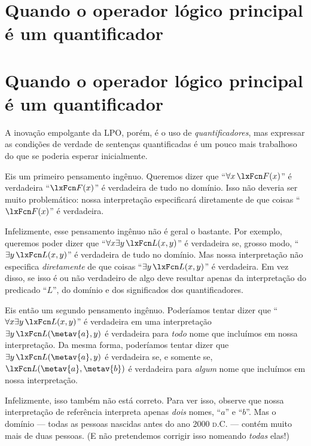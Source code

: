 \ifHTMLtarget
\section{Quando o operador lógico principal é um quantificador}
\else
\section[Quantificadores]{Quando o operador lógico principal é um quantificador}
\fi
\label{s:MainLogicalOperatorQuantifier}

A inovação empolgante da LPO, porém, é o uso de \emph{quantificadores}, mas expressar as condições de verdade de sentenças quantificadas é um pouco mais trabalhoso do que se poderia esperar inicialmente.

Eis um primeiro pensamento ingênuo. Queremos dizer que \textquotedblleft $\forall x\, \atom{F}{x}$\textquotedblright{} é verdadeira \ifeff{} \textquotedblleft $\atom{F}{x}$\textquotedblright{} é verdadeira de tudo no domínio. Isso não deveria ser muito problemático: nossa interpretação especificará diretamente de que coisas \textquotedblleft $\atom{F}{x}$\textquotedblright{} é verdadeira.

Infelizmente, esse pensamento ingênuo não é geral o bastante. Por exemplo, queremos poder dizer que \textquotedblleft $\forall x \exists y\, \atom{L}{x,y}$\textquotedblright{} é verdadeira se, grosso modo, \textquotedblleft $\exists y\, \atom{L}{x,y}$\textquotedblright{} é verdadeira de tudo no domínio. Mas nossa interpretação não especifica \emph{diretamente} de que coisas \textquotedblleft $\exists y\, \atom{L}{x,y}$\textquotedblright{} é verdadeira. Em vez disso, se isso é ou não verdadeiro de algo deve resultar apenas da interpretação do predicado \textquotedblleft $L$\textquotedblright{}, do domínio e dos significados dos quantificadores.

Eis então um segundo pensamento ingênuo. Poderíamos tentar dizer que \textquotedblleft $\forall x \exists y\, \atom{L}{x,y}$\textquotedblright{} é verdadeira em uma interpretação \ifeff{} $\exists y\, \atom{L}{\metav{a},y}$ é verdadeira para \emph{todo} nome  que incluímos em nossa interpretação. Da mesma forma, poderíamos tentar dizer que $\exists y\, \atom{L}{\metav{a},y}$ é verdadeira se, e somente se, $\atom{L}{\metav{a},\metav{b}}$ é verdadeira para \emph{algum} nome  que incluímos em nossa interpretação.

Infelizmente, isso também não está correto. Para ver isso, observe que nossa interpretação de referência interpreta apenas \emph{dois} nomes, \textquotedblleft $a$\textquotedblright{} e \textquotedblleft $b$\textquotedblright{}. Mas o domínio — todas as pessoas nascidas antes do ano 2000 \textsc{d.C.} — contém muito mais de duas pessoas. (E não pretendemos corrigir isso nomeando \emph{todas} elas!)

